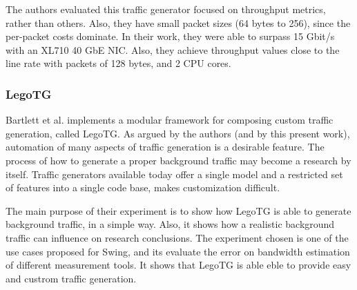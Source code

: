 The authors evaluated this traffic generator focused on throughput metrics, rather than others. Also, they have small packet sizes (64 bytes to 256), since the per-packet costs dominate. In their work, they were able to surpass 15 Gbit/s with an XL710 40 GbE NIC. Also, they achieve throughput values close to the line rate with packets of 128 bytes, and 2 CPU cores. 


\subsubsection{LegoTG}

Bartlett et al.\cite{legotg-paper} implements a modular framework for composing custom traffic generation, called LegoTG. As argued by the authors (and by this present work), automation of many aspects of traffic generation is a desirable feature. The process of how to generate a proper background traffic may become a research by itself. Traffic generators available today offer a single model and a restricted set of features into a single code base, makes customization difficult. 

The main purpose of their experiment is to show how LegoTG is able to generate background traffic, in a simple way. Also, it shows how a realistic background traffic can influence on research conclusions. The experiment chosen is one of the use cases proposed for Swing\cite{background-traffic-matter}, and its evaluate the error on bandwidth estimation of different measurement tools. It shows that LegoTG is able eble to provide easy and custrom traffic generation.









